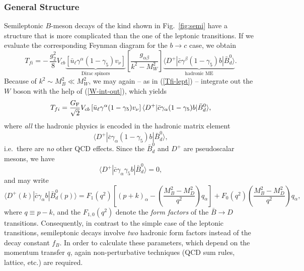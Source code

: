 \documentclass[11pt]{cernrep}
\begin{document}
\subsubsection{General Structure}
%
%
%
Semileptonic $B$-meson decays of the kind shown in Fig.~\ref{fig:semi}
have a structure that is more complicated than the one of the 
leptonic transitions. If we evaluate the corresponding Feynman diagram
for the $b\to c$ case, we obtain
\begin{equation}\label{Tfi-semi-full}
T_{fi}=-\,\frac{g_2^2}{8} V_{cb}
\underbrace{\left[\bar u_\ell\gamma^\alpha(1-\gamma_5)v_\nu
\right]}_{\mbox{Dirac spinors}}
\left[\frac{g_{\alpha\beta}}{k^2-M_W^2}\right]
\underbrace{\langle D^+|\bar c\gamma^\beta
(1-\gamma_5)b|\bar B^0_d\rangle}_{\mbox{hadronic ME}}.
\end{equation}
Because of $k^2\sim M_B^2\ll M_W^2$, we may again -- as in (\ref{Tfi-lept}) --
integrate out the $W$ boson with the help of (\ref{W-int-out}), which
yields
\begin{equation}\label{Tfi-semi}
T_{fi}=\frac{G_{\rm F}}{\sqrt{2}}V_{cb}\left[\bar u_\ell\gamma^\alpha
(1-\gamma_5)v_\nu\right]\langle  D^+|\bar c\gamma_\alpha(1-\gamma_5)b
|\bar B^0_d\rangle,
\end{equation}
where {\it all} the hadronic physics is encoded in the hadronic
matrix element
\begin{displaymath}
\langle D^+|\bar c\gamma_\alpha
(1-\gamma_5)b|\bar B^0_d\rangle,
\end{displaymath}
i.e.\ there are {\it no} other QCD effects.
Since the $\bar B^0_d$ and $D^+$ are pseudoscalar mesons, we have
\begin{equation}
\langle D^+|\bar c\gamma_\alpha\gamma_5b|
\bar B^0_d\rangle=0,
\end{equation}
and may write
\begin{equation}\label{BD-ME}
\langle D^+(k)|\bar c\gamma_\alpha b|\bar B^0_d(p)
\rangle=F_1(q^2)\left[(p+k)_\alpha -
\left(\frac{M_B^2-M_D^2}{q^2}\right)q_\alpha\right]
+F_0(q^2)\left(\frac{M_B^2-M_D^2}{q^2}\right)q_\alpha, 
\end{equation}
where $q\equiv p-k$, and the $F_{1,0}(q^2)$ denote the {\it form factors}
of the $\bar B\to D$ transitions. Consequently, in contrast to the simple 
case of the leptonic transitions, semileptonic decays involve {\it two} 
hadronic form factors instead of the decay constant $f_B$. In order to 
calculate these parameters, which depend on the momentum transfer $q$, 
again non-perturbative techniques (QCD sum rules, lattice,  etc.) are 
required.
\end{document}
